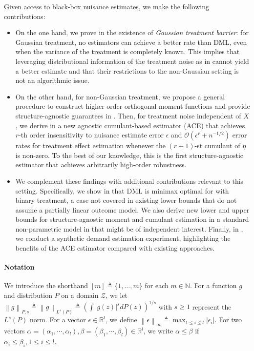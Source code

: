 \documentclass{article}
\def\eps{{\epsilon}}
\def\gO{{\mathcal{O}}}
\def\gZ{{\mathcal{Z}}}
\newcommand{\R}{\mathbb{R}}
\def\defeq{\triangleq} %
\newcommand{\infnorm}[1]{\norm{#1}_{\infty}} %
\def\naturals{\mathbb{N}} %
\newcommand{\norm}[1]{\left\| #1 \right\|}
\begin{document}
Given access to black-box nuisance estimates, we make the following  contributions:

%

\begin{itemize}[leftmargin=2em]
    \item On the one hand, we prove in  the existence of \textit{Gaussian treatment barrier}: for Gaussian treatment, no estimators can achieve a better rate than DML, even when the variance of the treatment is completely known. This implies that leveraging distributional information of the treatment noise as in \citet{mackey2018orthogonal} cannot yield a better estimate and that their restrictions to the non-Gaussian setting is not an algorithmic issue.
    \item On the other hand, for non-Gaussian treatment, we propose a general procedure to construct higher-order orthogonal moment functions and provide structure-agnostic guarantees in . Then, for treatment noise independent of $X$, we derive in   a new agnostic cumulant-based estimator (ACE) that achieves $r$-th order insensitivity to nuisance estimate error $\eps$ and  $\gO(\eps^r+n^{-1/2})$ error rates for treatment effect estimation whenever the $(r+1)$-st cumulant of $\eta$ is non-zero. To the best of our knowledge, this is the first structure-agnostic estimator that achieves arbitrarily high-order robustness.
    \item We complement these findings with additional contributions relevant to this setting. Specifically, we show in  that DML is minimax optimal for  with binary treatment, a case not covered in existing lower bounds that do not assume a partially linear outcome model. We also derive new lower and upper bounds for structure-agnostic moment and cumulant estimation in a standard non-parametric model in  that might be of independent interest. Finally, in , we conduct a  synthetic demand estimation experiment, highlighting the benefits of the ACE estimator compared with existing approaches.
\end{itemize}

\paragraph{Notation}
We introduce the shorthand $[m] \defeq\{1,\dots,m\}$ for each $m\in\naturals$.
For a function $g$ and distribution $P$ on a domain $\gZ$, we let $\norm{g}_{P,s}\defeq \norm{g}_{L^s(P)} \defeq (\int |g(z)|^sdP(z))^{1/s}$ with $s\geq 1$ represent the $L^s(P)$ norm.
For a vector $\epsilon\in\R^l$, we define $\infnorm{\eps} \defeq \max_{1\leq i\leq l}|\eps_i|$. For two vectors $\alpha=(\alpha_1,\cdots,\alpha_l),\beta=(\beta_1,\cdots,\beta_l)\in\R^l$, we write $\alpha\leq\beta$ if $\alpha_i\leq\beta_i,1\leq i\leq l$.
\end{document}
